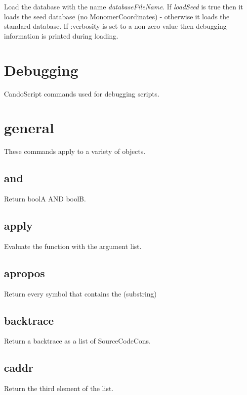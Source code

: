 \begin{itemize}
Load the database with the name \emph{databaseFileName}.
If \emph{loadSeed} is true then it loads the seed database (no MonomerCoordinates) 
- otherwise it loads the standard database.
If :verbosity is set to a non zero value then debugging information is printed during loading.

\section{Debugging}
CandoScript commands used for debugging scripts.

\section{general}
These commands apply to a variety of objects.

\subsection{and}
  \par

  Return boolA AND boolB.

\subsection{apply}

  Evaluate the function with the argument list.

\subsection{apropos}

  Return every symbol that contains the (substring)

\subsection{backtrace}

  Return a backtrace as a list of SourceCodeCons.

\subsection{caddr}

  Return the third element of the list.


\end{itemize}
